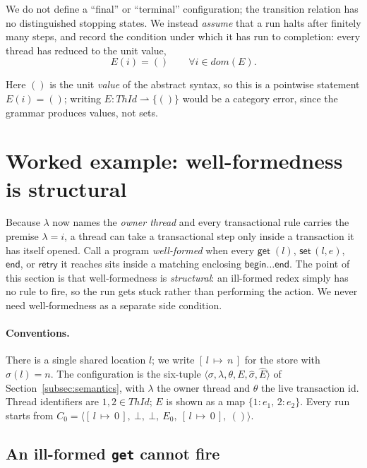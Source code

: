 \documentclass[manuscript,nonacm]{acmart}
\theoremstyle{acmdefinition}
\newcommand{\ThId}{\mathit{ThId}}   %
\newcommand{\unit}{()}
\newcommand{\bbegin}{\textsf{begin}}
\newcommand{\eend}{\textsf{end}}
\newcommand{\retry}{\textsf{retry}}
\newcommand{\getc}[1]{\textsf{get}\;(#1)}
\newcommand{\setc}[2]{\textsf{set}\,(#1,#2)}
\newcommand{\st}[1]{[\,l\,{\mapsto}\,#1\,]}          %
\newcommand{\emap}[1]{\{#1\}}                          %
\begin{document}
We do not define a ``final'' or ``terminal'' configuration; the transition
relation has no distinguished stopping states. We instead \emph{assume} that a run
halts after finitely many steps, and record the condition under which it has run
to completion: every thread has reduced to the unit value,
\[
E(i) = \unit \qquad \forall i \in dom(E).
\]

Here $\unit$ is the unit \emph{value} of the abstract syntax, so this is a
pointwise statement $E(i)=\unit$; writing $E : \ThId \rightharpoonup \{\unit\}$
would be a category error, since the grammar produces values, not sets.



\section{Worked example: well-formedness is structural}
\label{sec:examples}

Because $\lambda$ now names the \emph{owner thread} and every transactional rule
carries the premise $\lambda = i$, a thread can take a transactional step only
inside a transaction it has itself opened. Call a program \emph{well-formed} when
every $\getc{l}$, $\setc{l}{e}$, $\eend$, or $\retry$ it reaches sits inside a
matching enclosing $\bbegin\dots\eend$. The point of this section is that
well-formedness is \emph{structural}: an ill-formed redex simply has no rule to
fire, so the run gets stuck rather than performing the action. We never need
well-formedness as a separate side condition.

\paragraph{Conventions.}
There is a single shared location $l$; we write $\st{n}$ for the store with
$\sigma(l)=n$. The configuration is the six-tuple
$\langle\sigma,\lambda,\theta,E,\hat{\sigma},\hat{E}\rangle$ of
Section~\ref{subsec:semantics}, with $\lambda$ the owner thread and $\theta$ the live
transaction id. Thread identifiers are $1,2\in\ThId$; $E$ is shown as a map
$\emap{1{:}e_1,\,2{:}e_2}$. Every run starts from
$C_0=\langle \st{0},\ \bot,\ \bot,\ E_0,\ \st{0},\ \unit\rangle$.

\subsection{An ill-formed \texttt{get} cannot fire}
\end{document}
